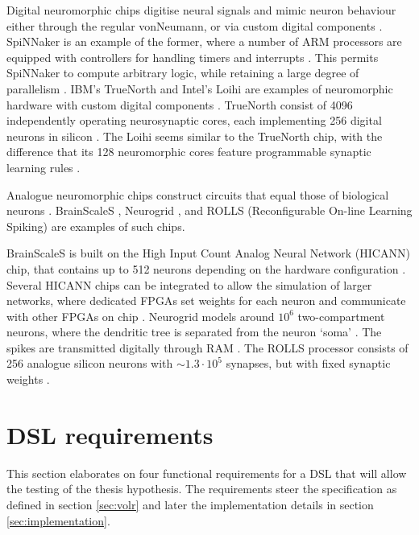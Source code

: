 \documentclass[report.tex]{subfiles}
\begin{document}
Digital neuromorphic chips digitise neural signals and mimic neuron
behaviour either through the regular \gls{vonNeumann}, or
via custom digital components \cite{Walter2015}.
SpiNNaker is an example of the former, where a number of \gls{ARM}
processors are equipped with controllers for handling timers and
interrupts \cite{Walter2015}.
This permits SpiNNaker to compute arbitrary logic, while retaining
a large degree of parallelism \cite{Albada2018}.
IBM's TrueNorth  and Intel's Loihi 
are examples of neuromorphic hardware with custom digital components 
\cite{Walter2015, Lin2018}.
TrueNorth consist of 4096 independently operating neurosynaptic cores, each implementing 256
digital neurons in silicon \cite{Walter2015, ArtificialBrains2018}.
The Loihi seems similar to the TrueNorth chip, with the difference that
its 128 neuromorphic cores feature programmable
synaptic learning rules \cite{Lin2018}.

Analogue neuromorphic chips construct circuits that equal those of biological
neurons \cite{Walter2015}.
BrainScaleS \cite{Schmitt2017}, Neurogrid \cite{BrainsInSilicon2018}, 
and ROLLS (Reconfigurable On-line Learning Spiking)
\cite{Walter2015} are examples of such chips.

BrainScaleS is built on the High Input Count Analog Neural Network (HICANN)
chip, that contains up to 512 neurons depending on the hardware configuration 
\cite{Pfeil2013}.
Several HICANN chips can be integrated to allow the simulation of larger
networks, where dedicated \gls{FPGA}s set weights for each neuron and
communicate with other \gls{FPGA}s on chip \cite{Walter2015}. 
Neurogrid models around $10^6$ two-compartment neurons, where the dendritic
tree is separated from the neuron `soma' \cite{Walter2015}.
The spikes are transmitted digitally through \gls{RAM} \cite{Walter2015}.
The ROLLS processor consists of 256 analogue silicon neurons with
$\sim1.3 \cdot 10^5$ synapses, but with fixed synaptic weights
\cite{Walter2015}.

\section{DSL requirements} \label{sec:requirements}
This section elaborates on four functional requirements for a \gls{DSL} that will allow the testing of the thesis hypothesis.
The requirements steer the specification as defined in section 
\ref{sec:volr} and later the implementation details in section
\ref{sec:implementation}.
\end{document}
